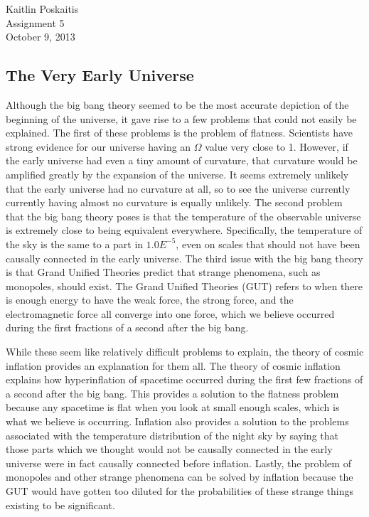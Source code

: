 \documentclass[12pt]{article}
\begin{document}
\noindent Kaitlin Poskaitis\\
Assignment 5\\
October 9, 2013
\begin{center}
    \section*{\bf The Very Early Universe}
\end{center}


Although the big bang theory seemed to be the most accurate depiction of the
beginning of the universe, it gave rise to a few problems that could not easily
be explained.  The first of these problems is the problem of flatness.
Scientists have strong evidence for our universe having an $\Omega$ value very
close to 1.  However, if the early universe had even a tiny amount of curvature,
that curvature would be amplified greatly by the expansion of the universe. It
seems extremely unlikely that the early universe had no curvature at all, so to
see the universe currently currently having almost no curvature is equally
unlikely.  The second problem that the big bang theory poses is that the
temperature of the observable universe is extremely close to being equivalent
everywhere.  Specifically, the temperature of the sky is the same to a part in
$1.0E^{-5}$, even on scales that should not have been causally connected in the
early universe.  The third issue with the big bang theory is that Grand Unified
Theories
predict that strange phenomena, such as monopoles, should exist.  The Grand
Unified Theories (GUT) refers to when there is enough energy to have the weak
force, the strong force, and the electromagnetic force all converge into one
force, which we believe occurred during the first fractions of a second after the
big bang.

While these seem like relatively difficult problems to explain, the theory of
cosmic inflation provides an explanation for them all.  The theory of cosmic
inflation explains how hyperinflation of spacetime occurred during the first few
fractions of a second after the big bang.  This provides a solution to the
flatness problem because any spacetime is flat when you look at small enough
scales, which is what we believe is occurring.  Inflation also provides a
solution to the problems associated with the temperature distribution of the
night sky by saying that those parts which we thought would not be causally
connected in the early universe were in fact causally connected before
inflation.  Lastly, the problem of monopoles and other strange phenomena can be
solved by inflation because the GUT would have gotten too diluted for the
probabilities of these strange things existing to be significant.
\end{document}
